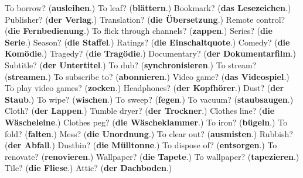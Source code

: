 \begin{tcolorbox}[breakable,colback=teal!4,colframe=teal!35!black,title={Before you move on}]
To borrow? (\textbf{ausleihen}.) To leaf? (\textbf{blättern}.) Bookmark? (\textbf{das Lesezeichen}.) Publisher? (\textbf{der Verlag}.) Translation? (\textbf{die Übersetzung}.) Remote control? (\textbf{die Fernbedienung}.) To flick through channels? (\textbf{zappen}.) Series? (\textbf{die Serie}.) Season? (\textbf{die Staffel}.) Ratings? (\textbf{die Einschaltquote}.) Comedy? (\textbf{die Komödie}.) Tragedy? (\textbf{die Tragödie}.) Documentary? (\textbf{der Dokumentarfilm}.) Subtitle? (\textbf{der Untertitel}.) To dub? (\textbf{synchronisieren}.) To stream? (\textbf{streamen}.) To subscribe to? (\textbf{abonnieren}.) Video game? (\textbf{das Videospiel}.) To play video games? (\textbf{zocken}.) Headphones? (\textbf{der Kopfhörer}.) Dust? (\textbf{der Staub}.) To wipe? (\textbf{wischen}.) To sweep? (\textbf{fegen}.) To vacuum? (\textbf{staubsaugen}.) Cloth? (\textbf{der Lappen}.) Tumble dryer? (\textbf{der Trockner}.) Clothes line? (\textbf{die Wäscheleine}.) Clothes peg? (\textbf{die Wäscheklammer}.) To iron? (\textbf{bügeln}.) To fold? (\textbf{falten}.) Mess? (\textbf{die Unordnung}.) To clear out? (\textbf{ausmisten}.) Rubbish? (\textbf{der Abfall}.) Dustbin? (\textbf{die Mülltonne}.) To dispose of? (\textbf{entsorgen}.) To renovate? (\textbf{renovieren}.) Wallpaper? (\textbf{die Tapete}.) To wallpaper? (\textbf{tapezieren}.) Tile? (\textbf{die Fliese}.) Attic? (\textbf{der Dachboden}.)
\end{tcolorbox}
